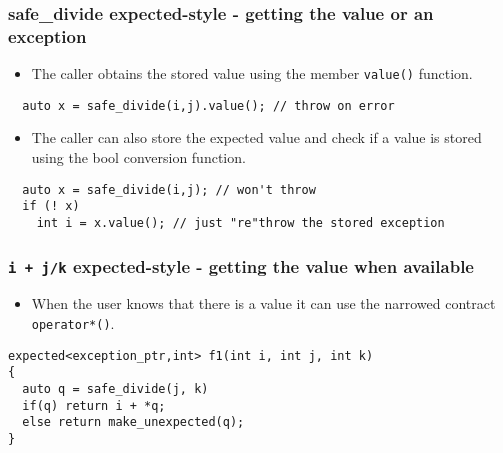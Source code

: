 \documentclass[xcolor=dvipsnames]{beamer}
\newcommand{\cpp}[1]{\lstinline{#1}}
\begin{document}
\begin{frame}[fragile]
\frametitle{safe\_divide expected-style  - getting the value or an exception}

\begin{itemize}
  \item The caller obtains the stored value using the member \cpp{value()} function.
\end{itemize}

\begin{lstlisting}
  auto x = safe_divide(i,j).value(); // throw on error
\end{lstlisting}

\begin{itemize}
  \item The caller can also store the expected value and check if a value is stored using the bool conversion  function.
\end{itemize}

\begin{lstlisting}
  auto x = safe_divide(i,j); // won't throw
  if (! x) 
    int i = x.value(); // just "re"throw the stored exception
\end{lstlisting}

\end{frame}
\begin{frame}[fragile]
\frametitle{\cpp{i + j/k} expected-style  - getting the value when available}

\begin{itemize}
  \item When the user knows that there is a value it can use the narrowed contract \cpp{operator*()}.
\end{itemize}

\begin{lstlisting}
expected<exception_ptr,int> f1(int i, int j, int k)
{
  auto q = safe_divide(j, k)
  if(q) return i + *q;
  else return make_unexpected(q);
}
\end{lstlisting}

\end{frame}
\end{document}
